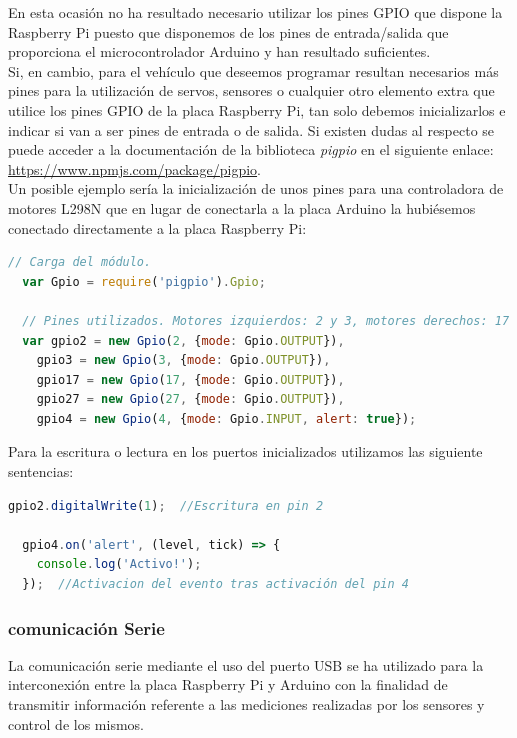 En esta ocasión no ha resultado necesario utilizar los pines GPIO que dispone la Raspberry Pi puesto que disponemos de los pines de entrada/salida que proporciona
el microcontrolador Arduino y han resultado suficientes.\\

Si, en cambio, para el vehículo que deseemos programar resultan necesarios más pines para la utilización de servos, sensores o cualquier otro elemento extra que utilice los pines
GPIO de la placa Raspberry Pi, tan solo debemos inicializarlos e indicar si van a ser pines de entrada o de salida. Si existen dudas al respecto se puede acceder a la documentación de
la biblioteca \emph{pigpio} en el siguiente enlace: \url{https://www.npmjs.com/package/pigpio}.\\

Un posible ejemplo sería la inicialización de unos pines para una controladora de motores L298N que en lugar de conectarla a la placa Arduino la hubiésemos conectado directamente a 
la placa Raspberry Pi:\\

\begin{lstlisting}[language=JavaScript]
  // Carga del módulo.
  var Gpio = require('pigpio').Gpio;

  // Pines utilizados. Motores izquierdos: 2 y 3, motores derechos: 17 y 27
  var gpio2 = new Gpio(2, {mode: Gpio.OUTPUT}),
    gpio3 = new Gpio(3, {mode: Gpio.OUTPUT}),
    gpio17 = new Gpio(17, {mode: Gpio.OUTPUT}),
    gpio27 = new Gpio(27, {mode: Gpio.OUTPUT}),
    gpio4 = new Gpio(4, {mode: Gpio.INPUT, alert: true});
\end{lstlisting}


Para la escritura o lectura en los puertos inicializados utilizamos las siguiente sentencias:\\

\begin{lstlisting}[language=JavaScript]
  gpio2.digitalWrite(1);  //Escritura en pin 2
  
  gpio4.on('alert', (level, tick) => {
    console.log('Activo!');
  });  //Activacion del evento tras activación del pin 4
\end{lstlisting}


\subsubsection{comunicación Serie}
\label{subsec:raspberry_serie}

La comunicación serie mediante el uso del puerto USB se ha utilizado para la interconexión entre la placa Raspberry Pi y Arduino con la finalidad de transmitir información referente
a las mediciones realizadas por los sensores y control de los mismos.\\

